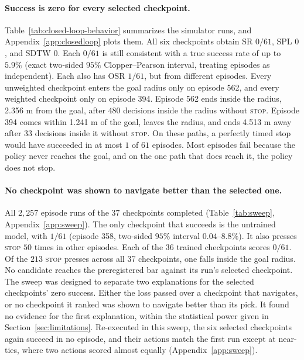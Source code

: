 \paragraph{Success is zero for every selected checkpoint.}
Table~\ref{tab:closed-loop-behavior} summarizes the simulator runs, and
Appendix~\ref{app:closedloop} plots them. All six checkpoints obtain SR $0/61$, SPL $0$, and SDTW
$0$. Each $0/61$ is still consistent with a true success rate of up to $5.9\%$ (exact two-sided $95\%$
Clopper--Pearson interval, treating episodes as independent). Each also has OSR $1/61$, but from different episodes. Every unweighted checkpoint enters the
goal radius only on episode 562, and every weighted checkpoint only on episode 394. Episode 562
ends inside the radius, 2.356 m from the goal, after 480 decisions inside the radius without
\textsc{stop}. Episode 394 comes within 1.241 m of the goal, leaves the radius, and ends 4.513 m away
after 33 decisions inside it without \textsc{stop}. On these paths, a perfectly timed stop would have succeeded in at most $1$ of $61$ episodes. Most episodes fail because the policy never
reaches the goal, and on the one path that does reach it, the policy does not stop.

\paragraph{No checkpoint was shown to navigate better than the selected one.}
All $2{,}257$ episode runs of the 37 checkpoints completed (Table~\ref{tab:sweep},
Appendix~\ref{app:sweep}). The only checkpoint that succeeds is the untrained model, with
$1/61$ (episode 358, two-sided $95\%$ interval $0.04$--$8.8\%$). It also presses
\textsc{stop} $50$ times in other episodes. Each of the 36 trained checkpoints scores $0/61$. Of the
$213$ \textsc{stop} presses across all 37 checkpoints, one falls inside the goal radius. No
candidate reaches the preregistered bar against its run's selected checkpoint. The sweep was
designed to separate two explanations for the selected checkpoints' zero success. Either the loss
passed over a checkpoint that navigates, or no checkpoint it ranked was shown to navigate better
than its pick. It found no evidence for the first explanation, within the statistical power given
in Section~\ref{sec:limitations}. Re-executed in this sweep, the six selected checkpoints again
succeed in no episode, and their actions match the first run except at near-ties, where two actions scored almost equally
(Appendix~\ref{app:sweep}).

